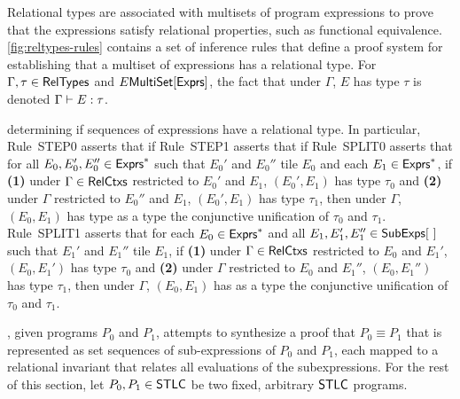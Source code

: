 %
%
%
%
Relational types are associated with multisets of program expressions
to prove that the expressions satisfy relational properties, such as
functional equivalence.
%
\autoref{fig:reltypes-rules} contains a set of inference rules that
define a proof system for establishing that a multiset of expressions
has a relational type.
%
For $\Gamma, \tau \in \mathsf{RelTypes}$ and $E \mathsf{MultiSet}[  \mathsf{Exprs}  ]$, the fact
that under $\Gamma$, $E$ has type $\tau$ is denoted $\Gamma \vdash E
: \tau$.

determining if sequences of expressions have
a relational type.
%
In particular, Rule~STEP0 asserts that if 
%
Rule~STEP1 asserts that if
%
Rule~SPLIT0 asserts that for all $E_0, E_0', E_0'' \in \mathsf{Exprs}^{*}$ such
that $E_0'$ and $E_0''$ tile $E_0$ and %
each $E_1 \in \mathsf{Exprs}^{*}$, if %
\textbf{(1)} under $\Gamma \in \mathsf{RelCtxs}$ restricted to $E_0'$ and
$E_1$, $(E_0', E_1)$ has type $\tau_0$ and %
\textbf{(2)} under $\Gamma$ restricted to $E_0''$ and $E_1$, $(E_0',
E_1)$ has type $\tau_1$, then under $\Gamma$, $(E_0, E_1)$ has type
as a type the conjunctive unification
%
%
of $\tau_0$ and $\tau_1$.
Rule~SPLIT1 asserts that for each $E_0 \in \mathsf{Exprs}^{*}$ and %
all $E_1, E_1', E_1'' \in \subexps$ such that $E_1'$ and $E_1''$ tile
$E_1$, if %
\textbf{(1)} under $\Gamma \in \mathsf{RelCtxs}$ restricted to $E_0$ and
$E_1'$, $(E_0, E_1')$ has type $\tau_0$ and %
\textbf{(2)} under $\Gamma$ restricted to $E_0$ and $E_1''$, $(E_0,
E_1'')$ has type $\tau_1$, then under $\Gamma$, $(E_0, E_1)$ has as a
type the conjunctive unification
%
%
of $\tau_0$ and $\tau_1$.


%
\sys, given programs $P_0$ and $P_1$, attempts to synthesize a proof
that $P_0 \equiv P_1$ that is represented as set sequences of
sub-expressions of $P_0$ and $P_1$, each mapped to a relational
invariant that relates all evaluations of the subexpressions.
%
For the rest of this section, let $P_0, P_1 \in \mathsf{STLC}$ be two fixed,
arbitrary $\mathsf{STLC}$ programs.

